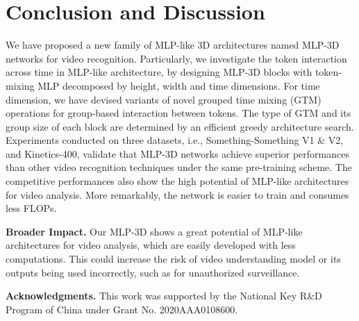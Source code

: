 \documentclass[10pt,twocolumn,letterpaper]{article}
\begin{document}
\section{Conclusion and Discussion}
We have proposed a new family of MLP-like 3D architectures named MLP-3D networks for video recognition.
Particularly, we investigate the token interaction across time in MLP-like architecture, by designing MLP-3D blocks with token-mixing MLP decomposed by height, width and time dimensions. For time dimension, we have devised variants of novel grouped time mixing (GTM) operations for group-based interaction between tokens. The type of GTM and its group size of each block are determined by an efficient greedy architecture search. Experiments conducted on three datasets, i.e., Something-Something V1 \& V2, and Kinetics-400, validate that MLP-3D networks achieve superior performances than other video recognition techniques under the same pre-training scheme. The competitive performances also show the high potential of MLP-like architectures for video analysis. More remarkably, the network is easier to train and consumes less FLOPs.

\textbf{Broader Impact.} Our MLP-3D shows a great potential of MLP-like architectures for video analysis, which are easily developed with less computations. This could increase the risk of video understanding model or its outputs being used incorrectly, such as for unauthorized surveillance.

\textbf{Acknowledgments.} This work was supported by the National Key R\&D Program of China under Grant No. 2020AAA0108600. 

{\small


}
\end{document}
